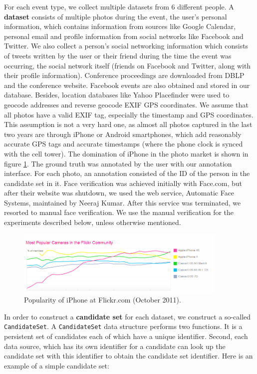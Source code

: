 For each event type, we collect multiple datasets from 6 different people. A \textbf{dataset} consists of multiple photos during the event, the user's personal information, which contains information from sources like Google Calendar, personal email and profile information from social networks like Facebook and Twitter. We also collect a person's social networking information which consists of tweets written by the user or their friend during the time the event was occurring, the social network itself (friends on Facebook and Twitter, along with their profile information). Conference proceedings are downloaded from DBLP and the conference website. Facebook events are also obtained and stored in our database. Besides, location databases like Yahoo Placefinder were used to geocode addresses and reverse geocode EXIF GPS coordinates. We assume that all photos have a valid EXIF tag, especially the timestamp and GPS coordinates. This assumption is not a very hard one, as almost all photos captured in the last two years are through iPhone or Android smartphones, which add reasonably accurate GPS tags and accurate timestamps (where the phone clock is synced with the cell tower). The domination of iPhone in the photo market is shown in figure \ref{fig:flickr-camera-popularity}. The ground truth was annotated by the user with our annotation interface. For each photo, an annotation consisted of the ID of the person in the candidate set in it. Face verification was achieved initially with Face.com, but after their website was shutdown, we used the web service, Automatic Face Systems, maintained by Neeraj Kumar. After this service was terminated, we resorted to manual face verification. We use the manual verification for the experiments described below, unless otherwise mentioned.

\begin{figure}[t]
\centering
\includegraphics[width=0.9\textwidth]{media/flickr-camera-popularity.png}
\caption{Popularity of iPhone at Flickr.com (October 2011).}
\label{fig:flickr-camera-popularity}
\end{figure}

In order to construct a \textbf{candidate set} for each dataset, we construct a so-called \texttt{CandidateSet}. A \texttt{CandidateSet} data structure performs two functions. It is a persistent set of candidates each of which have a unique identifier. Second, each data source, which has its own identifier for a candidate can look up the candidate set with this identifier to obtain the candidate set identifier. Here is an example of a simple candidate set:

